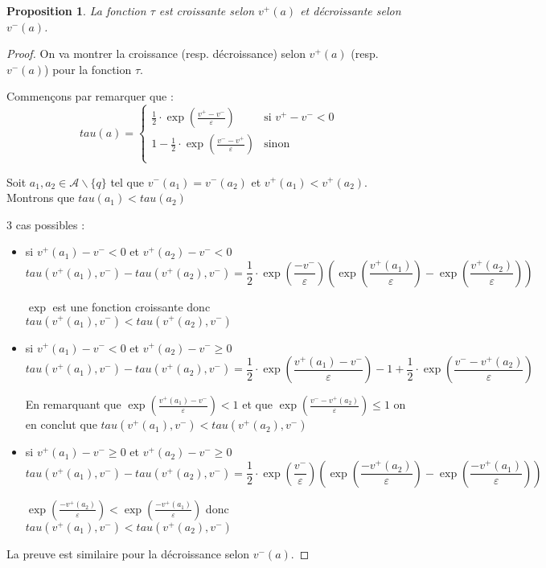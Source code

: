 \documentclass[11pt]{article}
\newtheorem{proposition}{Proposition}[section]
\theoremstyle{defi}
\theoremstyle{not}
\theoremstyle{prob}
\begin{document}
    \begin{proposition}
      La fonction $\tau$ est croissante selon $v^+(a)$ et décroissante selon $v^-(a)$.
    \end{proposition}
    \begin{proof}
      On va montrer la croissance (resp. décroissance) selon $v^+(a)$ (resp. $v^-(a)$) pour la fonction $\tau$.

      Commençons par remarquer que :
      $$tau(a) = \left\{
        \begin{array}{ll}
          \frac{1}{2} \cdot \exp(\frac{v^+ - v^-}{\varepsilon})  & \mbox{si } v^+ - v^- < 0 \\
          1 - \frac{1}{2} \cdot \exp(\frac{v^- - v^+}{\varepsilon}) & \mbox{sinon} \\
        \end{array}
      \right.$$

      Soit $a_1, a_2 \in \mathcal{A}\backslash \{q\}$ tel que $v^-(a_1) = v^-(a_2)$ et $v^+(a_1) < v^+(a_2)$. Montrons que $tau(a_1) < tau(a_2)$

      3 cas possibles :
      \begin{itemize}
        \item si $v^+(a_1) - v^- < 0$ et $v^+(a_2) - v^- < 0$
        $$tau(v^+(a_1), v^-) - tau(v^+(a_2), v^-) = \frac{1}{2} \cdot \exp(\frac{- v^-}{\varepsilon})(\exp(\frac{v^+(a_1)}{\varepsilon}) - \exp(\frac{v^+(a_2)}{\varepsilon}))$$

        $\exp$ est une fonction croissante donc $tau(v^+(a_1), v^-) < tau(v^+(a_2), v^-)$

        \item si $v^+(a_1) - v^- < 0$ et $v^+(a_2) - v^- \geq 0$
        $$tau(v^+(a_1), v^-) - tau(v^+(a_2), v^-) = \frac{1}{2} \cdot \exp(\frac{v^+(a_1) - v^-}{\varepsilon}) - 1 + \frac{1}{2} \cdot \exp(\frac{v^- - v^+(a_2)}{\varepsilon})$$

        En remarquant que $\exp(\frac{v^+(a_1) - v^-}{\varepsilon}) < 1$ et que $\exp(\frac{v^- - v^+(a_2)}{\varepsilon}) \leq 1$ on en conclut que $tau(v^+(a_1), v^-) < tau(v^+(a_2), v^-)$

        \item si $v^+(a_1) - v^- \geq 0$ et $v^+(a_2) - v^- \geq 0$
        $$tau(v^+(a_1), v^-) - tau(v^+(a_2), v^-) = \frac{1}{2} \cdot \exp(\frac{v^-}{\varepsilon})(\exp(\frac{- v^+(a_2)}{\varepsilon}) - \exp(\frac{- v^+(a_1)}{\varepsilon}))$$

        $\exp(\frac{- v^+(a_2)}{\varepsilon}) < \exp(\frac{- v^+(a_1)}{\varepsilon})$ donc $tau(v^+(a_1), v^-) < tau(v^+(a_2), v^-)$
      \end{itemize}

      La preuve est similaire pour la décroissance selon $v^-(a)$.
    \end{proof}
\end{document}
